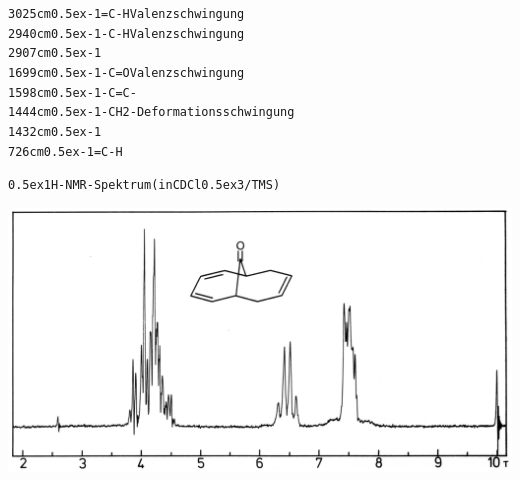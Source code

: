 \documentclass[a4paper,11pt]{article}
\begin{document}
\begin{alltt}

3025 cm\raise0.5ex\hbox{-1}   =C-H Valenzschwingung
2940 cm\raise0.5ex\hbox{-1}   -C-H Valenzschwingung
2907 cm\raise0.5ex\hbox{-1}
1699 cm\raise0.5ex\hbox{-1}   -C=O Valenzschwingung
1598 cm\raise0.5ex\hbox{-1}   -C=C-
1444 cm\raise0.5ex\hbox{-1}   -CH2- Deformationsschwingung
1432 cm\raise0.5ex\hbox{-1}
 726 cm\raise0.5ex\hbox{-1}   =C-H


\leavevmode\raise0.5ex\hbox{1}H-NMR-Spektrum (in CDCl\lower0.5ex\hbox{3}/TMS)
\end{alltt}
\hspace*{-0.25cm}\includegraphics[width=14.38cm]{NMR_041}
\end{document}
